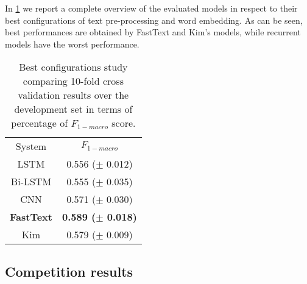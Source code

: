 In \cref{tab:overview} we report a complete overview of the evaluated models in respect to their best configurations of text pre-processing and word embedding. As can be seen, best performances are obtained by FastText and Kim's models, while recurrent models have the worst performance.
\begin{comment}
\begin{table}[h]
\footnotesize
\caption{Best configurations study comparing 10-fold cross validation results over the development set in terms of percentage of $F_{1-macro}$ score. }
\label{tab:overviewOLD}
\centering
\begin{tabular}{c|c}
\toprule
\hline
System		& $F_{1-macro}$		\\
\hline
LSTM		& 0.556 ($\pm$ 0.012) \\
Bi-LSTM		& 0.555 ($\pm$ 0.035) \\
CNN			& 0.571 ($\pm$ 0.030) \\
\textbf{FastText}	& \textbf{0.589} ($\pm$ 0.018) \\
Kim			& 0.579 ($\pm$ 0.009) \\
\hline
\bottomrule
\end{tabular}
\end{table}
\end{comment}


\begin{table}[h]
	\centering
	\caption{Best configurations study comparing 10-fold cross validation results over the development set in terms of percentage of $F_{1-macro}$ score. }
	\label{tab:overview}
	\begin{tabular}{c|c}
		\hline\noalign{\smallskip}
		System		& $F_{1-macro}$		\\
		\noalign{\smallskip}
		\hline
		\noalign{\smallskip}
		LSTM		& 0.556 ($\pm$ 0.012) \\
		Bi-LSTM		& 0.555 ($\pm$ 0.035) \\
		CNN			& 0.571 ($\pm$ 0.030) \\
		\textbf{FastText}	& \textbf{0.589 ($\pm$ 0.018)} \\
		Kim			& 0.579 ($\pm$ 0.009) \\
		\hline
	\end{tabular}
\end{table}


\subsection{Competition results} \label{subsec:results}


